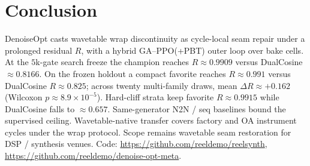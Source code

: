 \section{Conclusion}
\label{sec:conclusion}

DenoiseOpt casts wavetable wrap discontinuity as cycle-local seam repair under a prolonged residual $R$, with a hybrid GA--PPO(+PBT) outer loop over bake cells.
At the $5$k-gate search freeze the champion reaches $R\approx 0.9909$ versus DualCosine $\approx 0.8166$.
On the frozen holdout a compact favorite reaches $R\approx 0.991$ versus DualCosine $R\approx 0.825$; across twenty multi-family draws, mean $\Delta R\approx{+}0.162$ (Wilcoxon $p\approx 8.9{\times}10^{-5}$).
Hard-cliff strata keep favorite $R\approx 0.9915$ while DualCosine falls to $\approx 0.657$.
Same-generator N2N / seq baselines bound the supervised ceiling.
Wavetable-native transfer covers factory and OA instrument cycles under the wrap protocol.
Scope remains wavetable seam restoration for DSP / synthesis venues.
Code: \url{https://github.com/reeldemo/reelsynth}, \url{https://github.com/reeldemo/denoise-opt-meta}.
